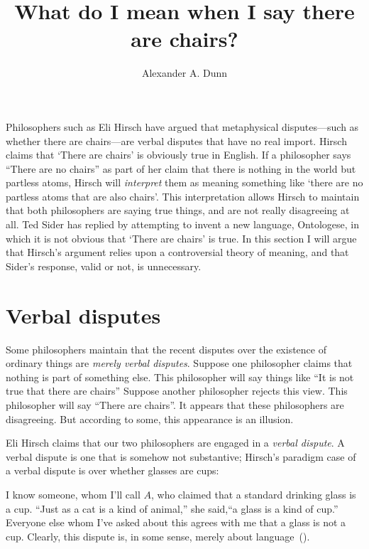 \documentclass[11pt]{article}
\title{What do I mean when I say there are chairs?}
\author{Alexander A. Dunn}
\newenvironment{squote}{%
\begin{spacing}{1}
       	\begin{list}{}{%
\setlength{\labelwidth}{0pt}%
\rightmargin\leftmargin%
}
\item\relax
}{%
\end{list}%
\end{spacing}
}
\begin{document}
\ifstandalone
\maketitle
\begin{spacing}{1.25}
\fi

\label{verbal}
Philosophers such as Eli Hirsch have argued that metaphysical
disputes---such as whether there are chairs---are verbal disputes that
have no real import.  Hirsch claims that `There are chairs' is
obviously true in English.  If a philosopher says ``There are no
chairs'' as part of her claim that there is nothing in the world but
partless atoms, Hirsch will {\em interpret} them as meaning something
like `there are no partless atoms that are also chairs'.  This
interpretation allows Hirsch to maintain that both philosophers are
saying true things, and are not really disagreeing at all.  Ted Sider
has replied by attempting to invent a new language, Ontologese, in
which it is not obvious that `There are chairs' is true.  In this
section I will argue that Hirsch's argument relies upon a
controversial theory of meaning, and that Sider's response, valid or
not, is unnecessary.

\section{Verbal disputes}
\label{hirsch}
Some philosophers maintain that the recent disputes over the existence
of ordinary things are {\em merely verbal disputes}.  Suppose one
philosopher claims that nothing is part of something else.  This
philosopher will say things like ``It is not true that there are
chairs'' Suppose another philosopher rejects this view.  This
philosopher will say ``There are chairs''.  It appears that these
philosophers are disagreeing.  But according to some, this appearance
is an illusion.

Eli Hirsch claims that our two philosophers are engaged in a {\em
  verbal dispute}.  A verbal dispute is one that is somehow not
substantive; Hirsch's paradigm case of a verbal dispute is over
whether glasses are cups:

\begin{squote}
  I know someone, whom I'll call $A$, who claimed that a standard
  drinking glass is a cup.  ``Just as a cat is a kind of animal,'' she
  said,``a glass is a kind of cup.''  Everyone else whom I've asked
  about this agrees with me that a glass is not a cup.  Clearly, this
  dispute is, in some sense, merely about
  language~(\citeyear[69]{hirsch2005}).
\end{squote}


\end{spacing}
\end{document}
